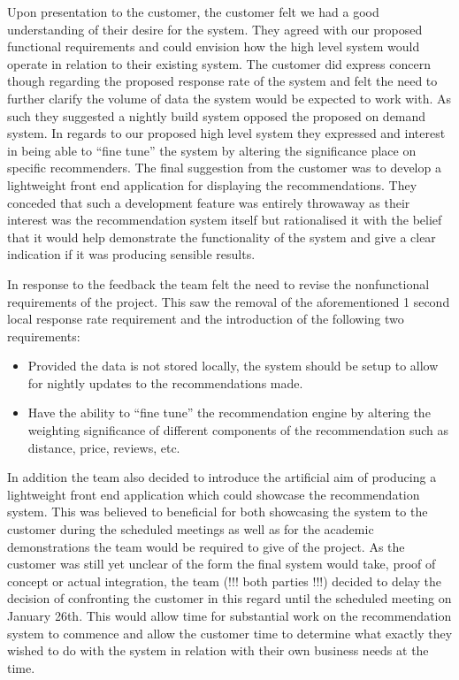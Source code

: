 \documentclass{l3proj}
\begin{document}
Upon presentation to the customer, the customer felt we had a good understanding of their desire for the system. They agreed with our proposed functional requirements and could envision how the high level system would operate in relation to their existing system. The customer did express concern though regarding the proposed response rate of the system and felt the need to further clarify the volume of data the system would be expected to work with. As such they suggested a nightly build system opposed the proposed on demand system. In regards to our proposed high level system they expressed and interest in being able to “fine tune” the system by altering the significance place on specific recommenders. The final suggestion from the customer was to develop a lightweight front end application for displaying the recommendations. They conceded that such a development feature was entirely throwaway as their interest was the recommendation system itself but rationalised it with the belief that it would help demonstrate the functionality of the system and give a clear indication if it was producing sensible results. 

In response to the feedback the team felt the need to revise the nonfunctional requirements of the project. This saw the removal of the aforementioned 1 second local response rate requirement and the introduction of the following two requirements:

\begin{itemize}
\item Provided the data is not stored locally, the system should be setup to allow for nightly updates to the recommendations made.
\item Have the ability to “fine tune” the recommendation engine by altering the weighting significance of different components of the recommendation such as distance, price, 
reviews, etc.
\end{itemize}

In addition the team also decided to introduce the artificial aim of producing a lightweight front end application which could showcase the recommendation system. This was believed to beneficial for both showcasing the system to the customer during the scheduled meetings as well as for the academic demonstrations the team would be required to give of the project. As the customer was still yet unclear of the form the final system would take, proof of concept or actual integration, the team (!!! both parties !!!) decided to delay the decision of confronting the customer in this regard until the scheduled meeting on January 26th. This would allow time for substantial work on the recommendation system to commence and allow the customer time to determine what exactly they wished to do with the system in relation with their own business needs at the time. 
\end{document}

